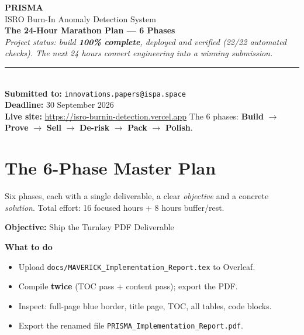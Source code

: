 \documentclass[11pt,a4paper]{article}
\newcommand{\code}[1]{\texttt{\small #1}}
\newcommand{\phasebox}[3]{\par\vspace{0.8em}\noindent
  \begin{tcolorbox}[colback=isroblue!6,colframe=isroblue,
    title={\sffamily\bfseries\color{white}#1 \quad (#2)},arc=2pt,boxrule=1.2pt]
    \textbf{Objective:} #3%
  \end{tcolorbox}\par\vspace{0.4em}}
\begin{document}
\begin{titlepage}
  \centering
  \vspace*{2cm}
  {\Huge\bfseries\color{isroblue} PRISMA}\\[0.6cm]
  {\LARGE ISRO Burn-In Anomaly Detection System}\\[0.4cm]
  {\large \textbf{The 24-Hour Marathon Plan --- 6 Phases}}\\[1.8cm]
  {\large\itshape Project status: build \textbf{100\% complete}, deployed and verified
  (22/22 automated checks). The next 24 hours convert engineering into a winning submission.}\\[1.2cm]
  {\color{isroorange}\rule{0.6\textwidth}{1pt}}\\[0.6cm]
  {\large\textbf{Submitted to:} \texttt{innovations.papers@ispa.space}}\\[0.3cm]
  {\large\textbf{Deadline:} 30 September 2026}\\[0.3cm]
  {\large\textbf{Live site:} \url{https://isro-burnin-detection.vercel.app}}
  \vfill
  {\small The 6 phases: \textbf{Build} $\rightarrow$ \textbf{Prove} $\rightarrow$ \textbf{Sell} $\rightarrow$ \textbf{De-risk} $\rightarrow$ \textbf{Pack} $\rightarrow$ \textbf{Polish}.}
\end{titlepage}

\section{The 6-Phase Master Plan}
\label{sec:plan}

\noindent Six phases, each with a single deliverable, a clear \emph{objective} and a concrete
\emph{solution}. Total effort: 16 focused hours + 8 hours buffer/rest.

\phasebox{Phase 1}{Hours 0--3}{Ship the Turnkey PDF Deliverable}

\textbf{What to do}
\begin{itemize}[leftmargin=1.5em]
  \item Upload \code{docs/MAVERICK\_Implementation\_Report.tex} to Overleaf.
  \item Compile \textbf{twice} (TOC pass + content pass); export the PDF.
  \item Inspect: full-page blue border, title page, TOC, all tables, code blocks.
  \item Export the renamed file \code{PRISMA\_Implementation\_Report.pdf}.
\end{itemize}
\end{document}
